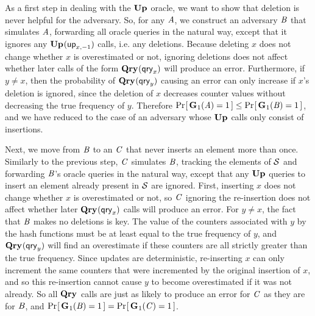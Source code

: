 As a first step in dealing with the $\textup{\textbf{Up}}\hspace{0.5pt}$ oracle, we want to show that deletion
is never helpful for the adversary. So, for any $\mathit{A}$, we construct an
adversary $\mathit{B}$ that simulates $\mathit{A}$, forwarding all oracle queries in the
natural way, except that it ignores any $\textup{\textbf{Up}}\hspace{0.5pt}(\mathsf{up}_{x,-1})$ calls, i.e. any
deletions. Because deleting $x$ does not change whether $x$ is overestimated or
not, ignoring deletions does not affect whether later calls of the form
$\textup{\textbf{Qry}}\hspace{0.5pt}(\mathsf{qry}_x)$ will produce an error. Furthermore, if $y \neq x$, then the
probability of $\textup{\textbf{Qry}}\hspace{0.5pt}(\mathsf{qry}_y)$ causing an error can only increase if $x$'s
deletion is ignored, since the deletion of $x$ decreases counter values without
decreasing the true frequency of $y$. Therefore
$\Pr\hspace{-1pt}\left[\,\textup{\textbf{G}}\hspace{0.5pt}_1(\mathit{A}) = 1\,\right] \le \Pr\hspace{-1pt}\left[\,\textup{\textbf{G}}\hspace{0.5pt}_1(\mathit{B}) = 1\,\right]$, and we have reduced
to the case of an adversary whose $\textup{\textbf{Up}}\hspace{0.5pt}$ calls only consist of insertions.


Next, we move from $\mathit{B}$ to an $\mathit{C}$ that never inserts an element more than
once. Similarly to the previous step, $\mathit{C}$ simulates $\mathit{B}$, tracking the
elements of $\mathcal{S}$ and forwarding $\mathit{B}$'s oracle queries in
the natural way, except that any $\textup{\textbf{Up}}\hspace{0.5pt}$ queries to insert an element already
present in $\mathcal{S}$ are ignored. First, inserting $x$ does not
change whether $x$ is overestimated or not, so $\mathit{C}$ ignoring the re-insertion
does not affect whether later $\textup{\textbf{Qry}}\hspace{0.5pt}(\mathsf{qry}_x)$ calls will produce an error. For
$y \neq x$, the fact that $\mathit{B}$ makes no deletions is key. The value of the
counters associated with $y$ by the hash functions must be at least equal to the
true frequency of $y$, and $\textup{\textbf{Qry}}\hspace{0.5pt}(\mathsf{qry}_y)$ will find an overestimate if these
counters are all strictly greater than the true frequency. Since updates are
deterministic, re-inserting $x$ can only increment the same counters that were
incremented by the original insertion of $x$, and so this re-insertion cannot
cause $y$ to become overestimated if it was not already. So all $\textup{\textbf{Qry}}\hspace{0.5pt}$ calls
are just as likely to produce an error for $\mathit{C}$ as they are for $\mathit{B}$, and
$\Pr\hspace{-1pt}\left[\,\textup{\textbf{G}}\hspace{0.5pt}_1(\mathit{B}) = 1\,\right] = \Pr\hspace{-1pt}\left[\,\textup{\textbf{G}}\hspace{0.5pt}_1(\mathit{C}) = 1\,\right]$.

